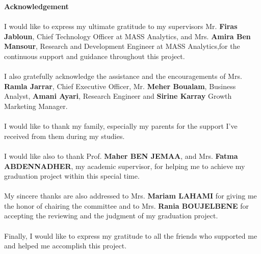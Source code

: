 
{\Huge \textbf{Acknowledgement}}
\\
\\I would like to express my ultimate gratitude to my supervisors Mr. \textbf{Firas Jabloun}, Chief Technology Officer at MASS Analytics, and Mrs. \textbf{Amira Ben Mansour}, Research and Development Engineer at MASS Analytics,for the continuous support and guidance throughout this project.
\\
\\
I also gratefully acknowledge the assistance and the encouragements of Mrs. \textbf{Ramla Jarrar}, Chief Executive Officer, Mr. \textbf{Meher Boualam}, Business Analyst, \textbf{Amani Ayari}, Research Engineer and \textbf{Sirine Karray} Growth Marketing Manager.
\\
\\
I would like to thank my family, especially my parents for the support I've received from them during my studies.
\\
\\
I would like also to thank Prof. \textbf{Maher BEN JEMAA}, and Mrs. \textbf{Fatma ABDENNADHER}, my academic supervisor, for helping me to achieve my graduation project within this special time.
\\
\\
My sincere thanks are also addressed to Mrs. \textbf{Mariam LAHAMI} for giving me the honor of chairing the committee and to Mrs. \textbf{Rania BOUJELBENE} for accepting the reviewing and the judgment of my graduation project.
\\
\\
Finally, I would like to express my gratitude to all the friends who supported me and helped me accomplish this project.

